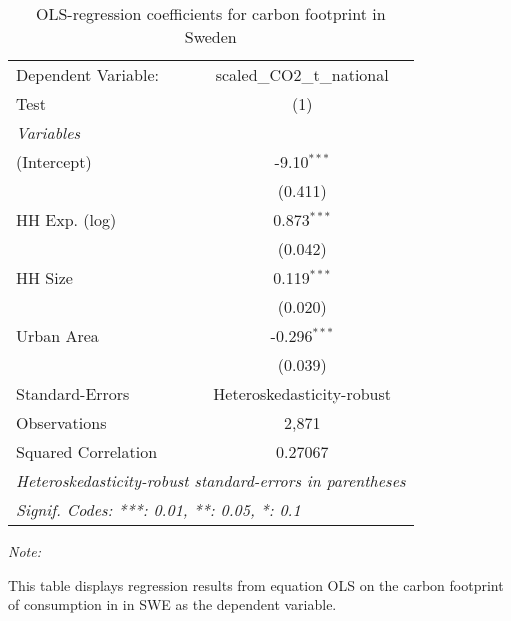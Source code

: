 
\begin{table}[htbp!]
   \centering
   \small
   \begin{adjustbox}{width = 1\textwidth, max height = 0.95\textheight, center}
      \begin{threeparttable}[b]
         \caption{\label{tab:OLS_2_SWE} OLS-regression coefficients for carbon footprint in Sweden}
         \begin{tabular}{lc}
            \tabularnewline \midrule \midrule
            Dependent Variable: & scaled\_CO2\_t\_national\\     
            Test                & (1)\\  
            \midrule
            \emph{Variables}\\
            (Intercept)         & -9.10$^{***}$\\   
                                & (0.411)\\   
            HH Exp. (log)       & 0.873$^{***}$\\   
                                & (0.042)\\   
            HH Size             & 0.119$^{***}$\\   
                                & (0.020)\\   
            Urban Area          & -0.296$^{***}$\\   
                                & (0.039)\\   
            \midrule 
            Standard-Errors     & Heteroskedasticity-robust \\   
            Observations        & 2,871\\  
            Squared Correlation & 0.27067\\  
            \midrule \midrule
            \multicolumn{2}{l}{\emph{Heteroskedasticity-robust standard-errors in parentheses}}\\
            \multicolumn{2}{l}{\emph{Signif. Codes: ***: 0.01, **: 0.05, *: 0.1}}\\
         \end{tabular}
         
         \begin{tablenotes}\item \medskip \textit{Note:}
            \item This table displays regression results from equation OLS on the carbon footprint of consumption in  in SWE as the dependent variable.  
         \end{tablenotes}
      \end{threeparttable}
   \end{adjustbox}
\end{table}


